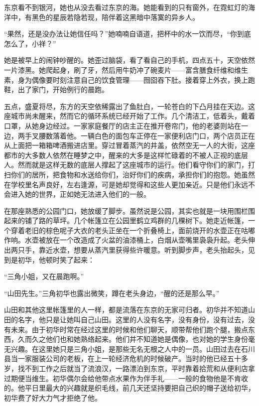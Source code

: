 \documentclass{article}
\begin{document}
东京看不到银河，她也从没去看过东京的海。她能看到的只有窗外，在霓虹灯的海洋中，有黑色的星辰若隐若现，陪伴着这黑暗中落寞的异乡人。



“果然，还是没办法让她信任吗？”她喃喃自语道，把杯中的水一饮而尽，“你到底怎么了，小祥？”



\newpage



她是被早上的闹钟吵醒的。她歪过脑袋，看了看自己的手机，四点五十，天空依然一片漆黑。她爬起身，刷了牙，然后用牛奶冲了碗麦片——富含膳食纤维和维生素，身为偶像要时刻注意自己的饮食管理——囫囵吞下肚。接着穿上外衣，换上跑鞋，出了家门，开始例行的晨跑。



五点，盛夏将尽，东方的天空依稀露出了鱼肚白，一轮苍白的下凸月挂在天边。这座城市尚未醒来，然而它的循环系统已经开始了工作。几个清洁工，低着头，戴着口罩，从她身边经过。一家家庭餐厅的店主正在推开卷帘门，他的老婆则站在一边，两手叉腰数落着他。一辆白色的面包车正停在一家便利店门口，两个店员正在从上面把一箱箱啤酒搬进店里。穿过冒着蒸汽的井盖，依然空无一人的大街，这座都市的大多数人依然在睡梦之中，醒来的大多是这样忙碌着的不被人正视的底层人。然而就是这样无数的底层人撑起了这座城市的运行。他们看守你们的家门，打扫你们的居所，把食物和水送给你们，治好你们的疾病，承担你们的抱怨。她虽然在学校里名声良好，左右逢源，可是她却觉得和这些人更加亲近。只是他们永远不会进入她的世界，正如她无法进入他们的一般。



在那座熟悉的公园门口，她放缓了脚步。虽然说是公园，其实也就是一块用围栏围起来的铺了路的草坪。几个帐篷立在公园里鹤立鸡群的几棵树下。她走近帐篷，一个穿着老旧的棕色呢子大衣的老头正坐在一个折叠椅上，面前烧开的水壶正在咕嘟作响。水壶被放在一个改造成了火盆的油漆桶上，白烟从壶嘴里袅袅升起。老头伸出两只手，靠近水壶，想要从蒸汽里获得些许暖意。听到脚步声，老头抬起头，见到是初华，他顿时笑了起来：



“三角小姐，又在晨跑啊。”



“山田先生。”三角初华也露出微笑，蹲在老头身边，“醒的还是那么早。”



山田和其他这里帐篷里的人一样，都是流落在东京的无家可归者。初华并不知道山田的名字，他只是让她叫自己山田。这里的人没有名字，没有身份，没有过去，没有未来。由于初华时常在经过这里的时候和他们聊天，顺带帮他们跑个腿，搬点东西，久而久之他们也和她熟络起来。他们并不知道她是偶像，也对她的学生身份毫无兴趣。在这里她只是三角小姐，是那些无名无根之人中的一员。山田过去在石川县当一家服装公司的老板，在上一轮经济危机的时候破产。当时的他已经五十多岁，找不到工作之后就当了流浪汉，一路漂泊到东京，平时靠着拾荒和从便利店拿过期便当维生。初华偶尔会给他带点水果作为伴手礼——一般的食物他是不肯收的。他平日里最大的兴趣就是织毛线，前几天还坚持要把自己织的帽子送给初华，初华费了好大力气才拒绝了他。
\end{document}
